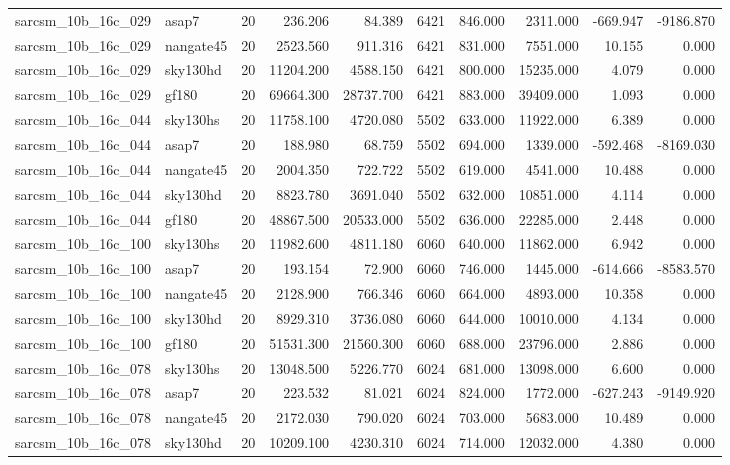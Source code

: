 \begin{tabular}{llrrrrrrrr}
sarcsm\_10b\_16c\_029 & asap7 & 20 & 236.206 & 84.389 & 6421 & 846.000 & 2311.000 & -669.947 & -9186.870 \\
sarcsm\_10b\_16c\_029 & nangate45 & 20 & 2523.560 & 911.316 & 6421 & 831.000 & 7551.000 & 10.155 & 0.000 \\
sarcsm\_10b\_16c\_029 & sky130hd & 20 & 11204.200 & 4588.150 & 6421 & 800.000 & 15235.000 & 4.079 & 0.000 \\
sarcsm\_10b\_16c\_029 & gf180 & 20 & 69664.300 & 28737.700 & 6421 & 883.000 & 39409.000 & 1.093 & 0.000 \\
sarcsm\_10b\_16c\_044 & sky130hs & 20 & 11758.100 & 4720.080 & 5502 & 633.000 & 11922.000 & 6.389 & 0.000 \\
sarcsm\_10b\_16c\_044 & asap7 & 20 & 188.980 & 68.759 & 5502 & 694.000 & 1339.000 & -592.468 & -8169.030 \\
sarcsm\_10b\_16c\_044 & nangate45 & 20 & 2004.350 & 722.722 & 5502 & 619.000 & 4541.000 & 10.488 & 0.000 \\
sarcsm\_10b\_16c\_044 & sky130hd & 20 & 8823.780 & 3691.040 & 5502 & 632.000 & 10851.000 & 4.114 & 0.000 \\
sarcsm\_10b\_16c\_044 & gf180 & 20 & 48867.500 & 20533.000 & 5502 & 636.000 & 22285.000 & 2.448 & 0.000 \\
sarcsm\_10b\_16c\_100 & sky130hs & 20 & 11982.600 & 4811.180 & 6060 & 640.000 & 11862.000 & 6.942 & 0.000 \\
sarcsm\_10b\_16c\_100 & asap7 & 20 & 193.154 & 72.900 & 6060 & 746.000 & 1445.000 & -614.666 & -8583.570 \\
sarcsm\_10b\_16c\_100 & nangate45 & 20 & 2128.900 & 766.346 & 6060 & 664.000 & 4893.000 & 10.358 & 0.000 \\
sarcsm\_10b\_16c\_100 & sky130hd & 20 & 8929.310 & 3736.080 & 6060 & 644.000 & 10010.000 & 4.134 & 0.000 \\
sarcsm\_10b\_16c\_100 & gf180 & 20 & 51531.300 & 21560.300 & 6060 & 688.000 & 23796.000 & 2.886 & 0.000 \\
sarcsm\_10b\_16c\_078 & sky130hs & 20 & 13048.500 & 5226.770 & 6024 & 681.000 & 13098.000 & 6.600 & 0.000 \\
sarcsm\_10b\_16c\_078 & asap7 & 20 & 223.532 & 81.021 & 6024 & 824.000 & 1772.000 & -627.243 & -9149.920 \\
sarcsm\_10b\_16c\_078 & nangate45 & 20 & 2172.030 & 790.020 & 6024 & 703.000 & 5683.000 & 10.489 & 0.000 \\
sarcsm\_10b\_16c\_078 & sky130hd & 20 & 10209.100 & 4230.310 & 6024 & 714.000 & 12032.000 & 4.380 & 0.000 \\

\end{tabular}
